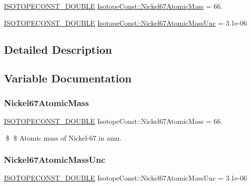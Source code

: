 \begin{DoxyCompactItemize}
\item 
\mbox{\hyperlink{group___isotope_const-_macros_ga8f45a7272ce02c0b4c65c44636ed719a}{I\+S\+O\+T\+O\+P\+E\+C\+O\+N\+S\+T\+\_\+\+D\+O\+U\+B\+LE}} \mbox{\hyperlink{group___isotope_const-_nickel-_ni67_gaa079e85cd9fff0dfa1799adfc3ed635a}{Isotope\+Const\+::\+Nickel67\+Atomic\+Mass}} = 66.
\item 
\mbox{\hyperlink{group___isotope_const-_macros_ga8f45a7272ce02c0b4c65c44636ed719a}{I\+S\+O\+T\+O\+P\+E\+C\+O\+N\+S\+T\+\_\+\+D\+O\+U\+B\+LE}} \mbox{\hyperlink{group___isotope_const-_nickel-_ni67_ga7e8cd06ec7d16f4678eec51403174d11}{Isotope\+Const\+::\+Nickel67\+Atomic\+Mass\+Unc}} = 3.\+1e-\/06
\end{DoxyCompactItemize}


\subsection{Detailed Description}


\subsection{Variable Documentation}
\mbox{\label{group___isotope_const-_nickel-_ni67_gaa079e85cd9fff0dfa1799adfc3ed635a}} 
\subsubsection{\texorpdfstring{Nickel67\+Atomic\+Mass}{Nickel67AtomicMass}}
{\footnotesize\ttfamily \mbox{\hyperlink{group___isotope_const-_macros_ga8f45a7272ce02c0b4c65c44636ed719a}{I\+S\+O\+T\+O\+P\+E\+C\+O\+N\+S\+T\+\_\+\+D\+O\+U\+B\+LE}} Isotope\+Const\+::\+Nickel67\+Atomic\+Mass = 66.}

\$ \$ Atomic mass of Nickel-\/67 in amu. \mbox{\label{group___isotope_const-_nickel-_ni67_ga7e8cd06ec7d16f4678eec51403174d11}} 
\subsubsection{\texorpdfstring{Nickel67\+Atomic\+Mass\+Unc}{Nickel67AtomicMassUnc}}
{\footnotesize\ttfamily \mbox{\hyperlink{group___isotope_const-_macros_ga8f45a7272ce02c0b4c65c44636ed719a}{I\+S\+O\+T\+O\+P\+E\+C\+O\+N\+S\+T\+\_\+\+D\+O\+U\+B\+LE}} Isotope\+Const\+::\+Nickel67\+Atomic\+Mass\+Unc = 3.\+1e-\/06}

